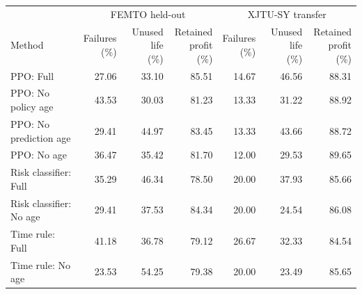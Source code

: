 {\footnotesize\setlength{\tabcolsep}{3pt}\renewcommand{\arraystretch}{1.08}%
\begin{tabular}{@{}lrrrrrr@{}}
\toprule
 & \multicolumn{3}{c}{FEMTO held-out} & \multicolumn{3}{c}{XJTU-SY transfer}\\
\cmidrule(lr){2-4}\cmidrule(l){5-7}
Method & \shortstack{Failures\\(\%)} & \shortstack{Unused life\\(\%)} & \shortstack{Retained\\profit (\%)} & \shortstack{Failures\\(\%)} & \shortstack{Unused life\\(\%)} & \shortstack{Retained\\profit (\%)}\\
\midrule
PPO: Full & 27.06 & 33.10 & 85.51 & 14.67 & 46.56 & 88.31\\
PPO: No policy age & 43.53 & 30.03 & 81.23 & 13.33 & 31.22 & 88.92\\
PPO: No prediction age & 29.41 & 44.97 & 83.45 & 13.33 & 43.66 & 88.72\\
PPO: No age & 36.47 & 35.42 & 81.70 & 12.00 & 29.53 & 89.65\\
\midrule
Risk classifier: Full & 35.29 & 46.34 & 78.50 & 20.00 & 37.93 & 85.66\\
Risk classifier: No age & 29.41 & 37.53 & 84.34 & 20.00 & 24.54 & 86.08\\
\midrule
Time rule: Full & 41.18 & 36.78 & 79.12 & 26.67 & 32.33 & 84.54\\
Time rule: No age & 23.53 & 54.25 & 79.38 & 20.00 & 23.49 & 85.65\\
\bottomrule
\end{tabular}}

